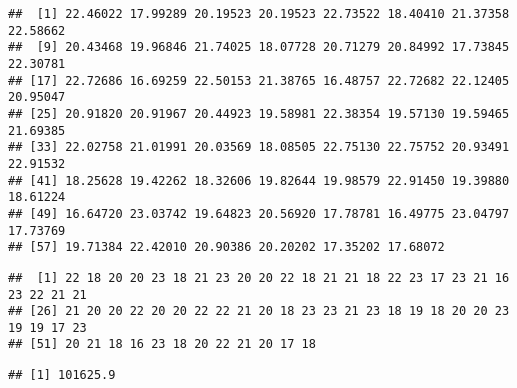 \documentclass[
]{article}
\newenvironment{Shaded}{\begin{snugshade}}{\end{snugshade}}
\newcommand{\CommentTok}[1]{\textcolor[rgb]{0.56,0.35,0.01}{\textit{#1}}}
\newcommand{\KeywordTok}[1]{\textcolor[rgb]{0.13,0.29,0.53}{\textbf{#1}}}
\newcommand{\NormalTok}[1]{#1}
\newcommand{\OperatorTok}[1]{\textcolor[rgb]{0.81,0.36,0.00}{\textbf{#1}}}
\begin{document}
\begin{verbatim}
##  [1] 22.46022 17.99289 20.19523 20.19523 22.73522 18.40410 21.37358 22.58662
##  [9] 20.43468 19.96846 21.74025 18.07728 20.71279 20.84992 17.73845 22.30781
## [17] 22.72686 16.69259 22.50153 21.38765 16.48757 22.72682 22.12405 20.95047
## [25] 20.91820 20.91967 20.44923 19.58981 22.38354 19.57130 19.59465 21.69385
## [33] 22.02758 21.01991 20.03569 18.08505 22.75130 22.75752 20.93491 22.91532
## [41] 18.25628 19.42262 18.32606 19.82644 19.98579 22.91450 19.39880 18.61224
## [49] 16.64720 23.03742 19.64823 20.56920 17.78781 16.49775 23.04797 17.73769
## [57] 19.71384 22.42010 20.90386 20.20202 17.35202 17.68072
\end{verbatim}

\begin{Shaded}
\end{Shaded}

\begin{verbatim}
##  [1] 22 18 20 20 23 18 21 23 20 20 22 18 21 21 18 22 23 17 23 21 16 23 22 21 21
## [26] 21 20 20 22 20 20 22 22 21 20 18 23 23 21 23 18 19 18 20 20 23 19 19 17 23
## [51] 20 21 18 16 23 18 20 22 21 20 17 18
\end{verbatim}

\begin{Shaded}
\end{Shaded}

\begin{verbatim}
## [1] 101625.9
\end{verbatim}

\begin{Shaded}
\end{Shaded}
\end{document}
